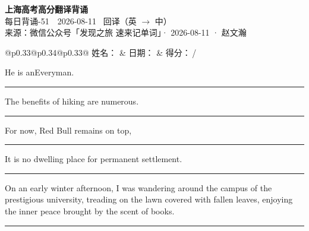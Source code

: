 \documentclass[11pt,a4paper]{article}
\newcommand{\num}[1]{\makebox[1.9em][r]{#1.}\hspace{0.3em}}
\newcommand{\wline}{\noindent\rule{\linewidth}{0.4pt}}
\begin{document}
\pagestyle{plain}
\begin{center}
{\LARGE\bfseries 上海高考高分翻译背诵 }\\[0.25em]
{\large 每日背诵-51　2026-08-11 \quad\ 回译（英 $\to$ 中）}\\[0.35em]
{\footnotesize 来源：微信公众号「发现之旅 速来记单词」· 2026-08-11 · 赵文瀚}
\end{center}

\vspace{0.4em}
\noindent\begin{tabular}{@{}p{0.33\textwidth}@{}p{0.34\textwidth}@{}p{0.33\textwidth}@{}}
姓名：\underline{\hspace{2.0cm}} & 日期：\underline{\hspace{2.0cm}} & 得分：\underline{\hspace{1.4cm}}\,/ \\
\end{tabular}

\vspace{0.5em}

\vspace{0.8em}
\num{1}He is anEveryman.

\vspace{0.25em}

\wline

\num{2}The benefits of hiking are numerous.

\vspace{0.25em}

\wline

\num{3}For now, Red Bull remains on top,

\vspace{0.25em}

\wline

\num{4}It is no dwelling place for permanent settlement.

\vspace{0.25em}

\wline

\num{5}On an early winter afternoon, I was wandering around the campus of the prestigious university, treading on the lawn covered with fallen leaves, enjoying the inner peace brought by the scent of books.

\vspace{0.25em}

\wline
\end{document}
